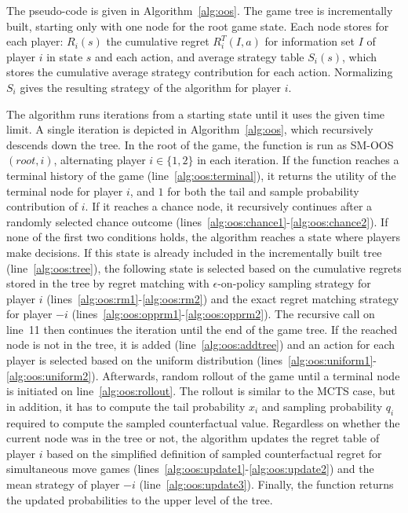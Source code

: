 The pseudo-code is given in Algorithm~\ref{alg:oos}. The game tree is incrementally built, starting only with one node for the root game state.
Each node stores for each player: $R_i(s)$ the cumulative regret $R_i^T(I,a)$ for information set $I$ of player $i$ in state $s$ and each action,
and average strategy table $S_i(s)$, which stores the cumulative average strategy contribution for each action.
Normalizing $S_i$ gives the resulting strategy of the algorithm for player $i$.

The algorithm runs iterations from a starting state until it uses the given time limit. A single iteration is depicted in Algorithm~\ref{alg:oos},
which recursively descends down the tree. In the root of the game, the function is run as SM-OOS$(root, i)$, alternating player $i\in\{1,2\}$ in
each iteration. If the function reaches a terminal history of the game (line~\ref{alg:oos:terminal}), it returns the utility of the terminal node
for player $i$, and $1$ for both the tail and sample probability contribution of $i$. If it reaches a chance node, it recursively continues after
a randomly selected chance outcome (lines~\ref{alg:oos:chance1}-\ref{alg:oos:chance2}). If none of the first two conditions holds, the algorithm
reaches a state where players make decisions. If this state is already included in the incrementally built tree (line~\ref{alg:oos:tree}), the
following state is selected based on the cumulative regrets stored in the tree by regret matching with $\epsilon$-on-policy sampling strategy for
player $i$ (lines~\ref{alg:oos:rm1}-\ref{alg:oos:rm2}) and the exact regret matching strategy for player $-i$ (lines~\ref{alg:oos:opprm1}-\ref{alg:oos:opprm2}).
The recursive call on line~11 then continues the iteration until the end of the game tree. If the reached node is not in the tree,
it is added (line~\ref{alg:oos:addtree}) and an action for each player is selected based on the uniform distribution
(lines~\ref{alg:oos:uniform1}-\ref{alg:oos:uniform2}). Afterwards, random rollout of the game until a terminal node is initiated on line~\ref{alg:oos:rollout}.
The rollout is similar to the MCTS case, but in addition, it has to compute the tail probability $x_i$ and sampling probability $q_i$
required to compute the sampled counterfactual value.
Regardless on whether the current node was in the tree or not, the algorithm updates the regret table of player $i$ based on the simplified definition of sampled counterfactual regret for simultaneous move games (lines~\ref{alg:oos:update1}-\ref{alg:oos:update2}) and the mean strategy of player $-i$ (line~\ref{alg:oos:update3}).
Finally, the function returns the updated probabilities to the upper level of the tree.

